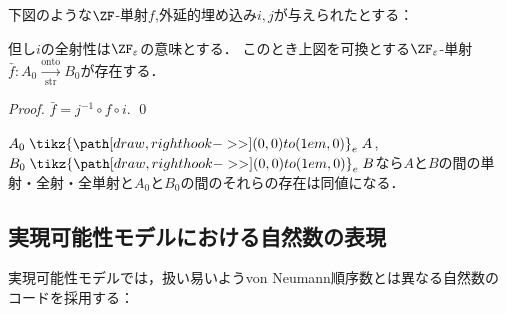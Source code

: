 \documentclass[realisability.tex]{subfiles}
\begin{document}
\begin{lemma}
 下図のような$\ZF$-単射$f$,外延的埋め込み$i, j$が与えられたとする：
 \begin{center}
 \end{center}
 但し$i$の全射性は$\ZFe$の意味とする．
 このとき上図を可換とする$\ZFe$-単射$\bar{f}: A_0 \xrightarrow[\mathrm{str}]{\mathrm{onto}} B_0$が存在する．
\end{lemma}
\begin{proof}
 $\bar{f} = j^{-1} \circ f \circ i$. \qed
\end{proof}

\begin{corollary}\label{cor:ext-emb-morphs}
 $A_0 \mathrel{\tikz{\path[draw,right hook->>] (0,0) to (1em,0)}}_e A$, $B_0 \mathrel{\tikz{\path[draw,right hook->>](0,0) to (1em,0)}}_e B$なら$A$と$B$の間の単射・全射・全単射と$A_0$と$B_0$の間のそれらの存在は同値になる．
\end{corollary}


\subsection{実現可能性モデルにおける自然数の表現}
実現可能性モデルでは，扱い易いようvon Neumann順序数とは異なる自然数のコードを採用する：
\end{document}
